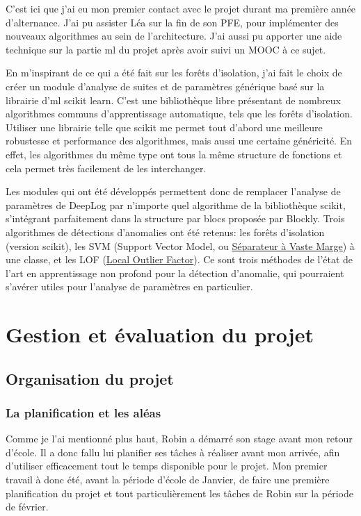 \documentclass[openany, 11pt]{memoir}
\begin{document}
\bigskip
C'est ici que j'ai eu mon premier contact avec le projet durant ma première année d'alternance. J'ai pu assister Léa sur la fin de son PFE, pour implémenter des nouveaux algorithmes au sein de l'architecture. J'ai aussi pu apporter une aide technique sur la partie \gls{ml} du projet après avoir suivi un MOOC à ce sujet.

En m'inspirant de ce qui a été fait sur les forêts d'isolation, j'ai fait le choix de créer un module d'analyse de suites et de paramètres générique basé sur la librairie d'\gls{ml} scikit learn. C'est une bibliothèque libre présentant de nombreux algorithmes communs d'apprentissage automatique, tels que les forêts d'isolation. Utiliser une librairie telle que scikit me permet tout d'abord une meilleure robustesse et performance des algorithmes, mais aussi une certaine généricité. En effet, les algorithmes du même type ont tous la même structure de fonctions et cela permet très facilement de les interchanger.

Les modules qui ont été développés permettent donc de remplacer l'analyse de paramètres de DeepLog par n'importe quel algorithme de la bibliothèque scikit, s'intégrant parfaitement dans la structure par blocs proposée par Blockly. Trois algorithmes de détections d'anomalies ont été retenus: les forêts d'isolation (version scikit), les SVM (Support Vector Model, ou \href{https://fr.wikipedia.org/wiki/Machine_à_vecteurs_de_support}{Séparateur à Vaste Marge}) à une classe, et les LOF (\href{https://en.wikipedia.org/wiki/Local_outlier_factor}{Local Outlier Factor}). Ce sont trois méthodes de l'état de l'art en apprentissage non profond pour la détection d'anomalie, qui pourraient s'avérer utiles pour l'analyse de paramètres en particulier.

\newpage
\chapter{Gestion et évaluation du projet}

\section{Organisation du projet}

\subsection{La planification et les aléas}

Comme je l'ai mentionné plus haut, Robin a démarré son stage avant mon retour d'école. Il a donc fallu lui planifier ses tâches à réaliser avant mon arrivée, afin d'utiliser efficacement tout le temps disponible pour le projet. Mon premier travail à donc été, avant la période d'école de Janvier, de faire une première planification du projet et tout particulièrement les tâches de Robin sur la période de février.
\end{document}
